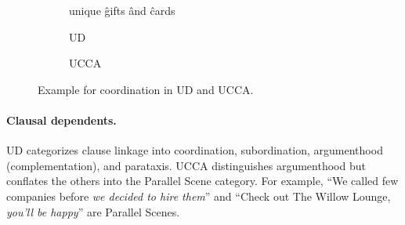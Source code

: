 \documentclass[11pt,a4paper,table]{article}
\begin{document}
\begin{figure}[th]
  \centering
\begin{subfigure}{.45\columnwidth}
    \begin{dependency}[text only label, label style={above,font=\tt}, font=\small, edge unit distance=1.5ex]
    \begin{deptext}[column sep=.1em,ampersand replacement=\^]
    unique \^ gifts \^ and \^ cards \\
    \end{deptext}
    \end{dependency}
    \caption{UD\label{fig:conj_ud}}
\end{subfigure}
\hfill
\begin{subfigure}{.45\columnwidth}
    \caption{UCCA\label{fig:conj_ucca}}
 \end{subfigure}
 \caption{Example for coordination in UD and UCCA.\label{fig:conj}}
\end{figure}


\paragraph{Clausal dependents.}
UD categorizes clause linkage into coordination,
subordination, argumenthood (complementation),
and parataxis. %
UCCA distinguishes argumenthood 
but conflates the others into the Parallel Scene category.
For example,
``We called few companies before \textit{we decided to hire them}''
and ``Check out The Willow Lounge, \textit{you'll be happy}'' are Parallel Scenes.
\end{document}
